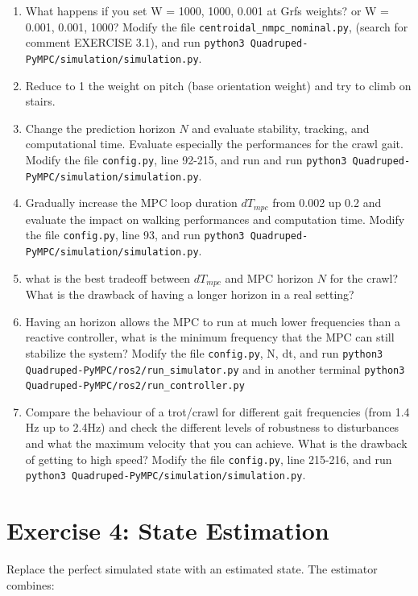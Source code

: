 \documentclass[11pt,a4paper]{article}
\begin{document}
\begin{enumerate}[label=\arabic*.]
	\item What happens if you set  W = 1000, 1000, 0.001 at Grfs weights? or W = 0.001, 0.001, 1000? Modify the file \texttt{centroidal\_nmpc\_nominal.py}, (search for comment
	EXERCISE 3.1), and run \verb|python3 Quadruped-PyMPC/simulation/simulation.py|.
	\item Reduce to 1 the weight on pitch (base orientation weight) and try to climb on stairs.
	\item Change the prediction horizon $N$ and evaluate stability, tracking, and computational time. Evaluate especially the performances for the crawl gait. Modify the file \texttt{config.py}, line 92-215, and run and run \verb|python3 Quadruped-PyMPC/simulation/simulation.py|.
	\item Gradually increase the MPC loop duration $dT_{mpc}$ from 0.002 up 0.2 and evaluate the impact on walking performances and computation time. Modify the file \texttt{config.py}, line 93, and run \verb|python3 Quadruped-PyMPC/simulation/simulation.py|.
	\item what is the best tradeoff between $dT_{mpc}$ and MPC horizon $N$ for the crawl? What is the drawback of having a longer horizon in a real setting?
	\item Having an horizon allows the MPC to run at much lower frequencies than a reactive controller, what is the minimum frequency that the MPC can still stabilize the system? Modify the file \texttt{config.py}, N, dt, and run  \verb|python3 Quadruped-PyMPC/ros2/run_simulator.py| and in another terminal \verb|python3 Quadruped-PyMPC/ros2/run_controller.py|
	\item Compare the behaviour of a trot/crawl for different gait frequencies (from 1.4 Hz up to 2.4Hz) and check the different levels of robustness to disturbances  and what the maximum velocity that you can achieve. 
	What is the drawback of  getting to high speed? Modify the file \texttt{config.py}, line 215-216, and run \verb|python3 Quadruped-PyMPC/simulation/simulation.py|.
\end{enumerate}



\section{Exercise 4: State Estimation}

Replace the perfect simulated state with an estimated state. The estimator  combines:
\end{document}
